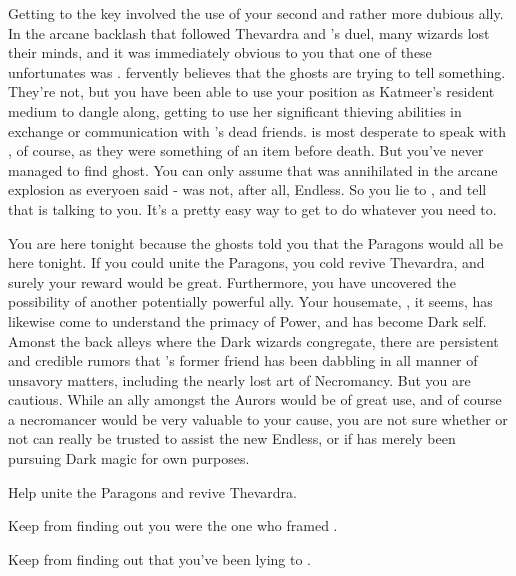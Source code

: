 \documentclass[char]{Katmeers}
\begin{document}
Getting to the key involved the use of your second and rather more dubious ally. In the arcane backlash that followed Thevardra and \cHarry{}'s duel, many wizards lost their minds, and it was immediately obvious to you that one of these unfortunates was \cGinny{}. \cGinny{} fervently believes that the ghosts are trying to tell \cGinny{\them} something. They're not, but you have been able to use your position as Katmeer's resident medium to dangle \cGinny{\them} along, getting \cGinny{\them} to use her significant thieving abilities in exchange or communication with \cGinny{}'s dead friends. \cGinny{} is most desperate to speak with \cHarry{}, of course, as they were something of an item before \cHarry{\their} death. But you've never managed to find \cHarry{\their} ghost. You can only assume that \cHarry{\they} was annihilated in the arcane explosion as everyoen said - \cHarry{\they} was not, after all, Endless. So you lie to \cGinny{\them}, and tell \cGinny{\them} that \cHarry{\they} is talking to you. It's a pretty easy way to get \cGinny{\them} to do whatever you need \cGinny{\them} to.

You are here tonight because the ghosts told you that the Paragons would all be here tonight. If you could unite the Paragons, you cold revive Thevardra, and surely your reward would be great. Furthermore, you have uncovered the possibility of another potentially powerful ally. Your housemate, \cHermione{}, it seems, has likewise come to understand the primacy of Power, and has become Dark \cHermione{\them}self. Amonst the back alleys where the Dark wizards congregate, there are persistent and credible rumors that \cHarry{}'s former friend has been dabbling in all manner of unsavory matters, including the nearly lost art of Necromancy. But you are cautious. While an ally amongst the Aurors would be of great use, and of course a necromancer would be very valuable to your cause, you are not sure whether or not \cHermione{\they} can really be trusted to assist the new Endless, or if \cHermione{\they} has merely been pursuing Dark magic for \cHermione{\their} own purposes.

\begin{itemz}[Goals]
	\item Help \cGoyle{\formal} unite the Paragons and revive Thevardra.
	\item Keep \cLucius{} from finding out you were the one who framed \cLucius{\them}.
	\item Keep \cGinny{} from finding out that you've been lying to \cGinny{\them}.
\end{itemz}
\end{document}
